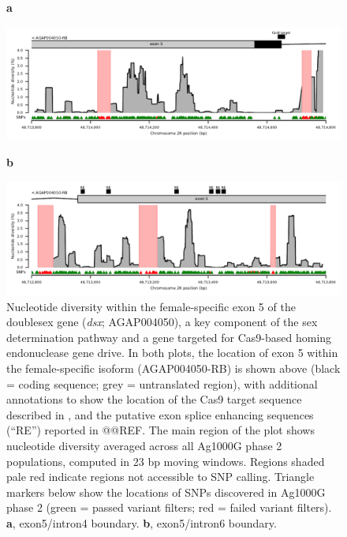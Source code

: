 \documentclass[a4paper,11pt,abstracton,hidelinks]{scrartcl}
\begin{document}
\clearpage

\begin{figure}[H]
    \textbf{a}
	\begin{center}
        \includegraphics[width=1.0\linewidth]{artwork/dsx_a.pdf}
	\end{center}
    \textbf{b}
	\begin{center}
        \includegraphics[width=1.0\linewidth]{artwork/dsx_b.pdf}
	\end{center}
    \caption{%
    Nucleotide diversity within the female-specific exon 5 of the doublesex gene (\textit{dsx}; AGAP004050), a key component of the sex determination pathway and a gene targeted for Cas9-based homing endonuclease gene drive.
    In both plots, the location of exon 5 within the female-specific isoform (AGAP004050-RB) is shown above (black = coding sequence; grey = untranslated region), with additional annotations to show the location of the Cas9 target sequence described in \cite{kyrou2018}, and the putative exon splice enhancing sequences (``RE'') reported in @@REF.
    The main region of the plot shows nucleotide diversity averaged across all Ag1000G phase 2 populations, computed in 23 bp moving windows.
    Regions shaded pale red indicate regions not accessible to SNP calling.
    Triangle markers below show the locations of SNPs discovered in Ag1000G phase 2 (green = passed variant filters; red = failed variant filters).
    \textbf{a}, exon5/intron4 boundary.
    \textbf{b}, exon5/intron6 boundary.
}
    \label{fig:dsx}
\end{figure}
\end{document}
